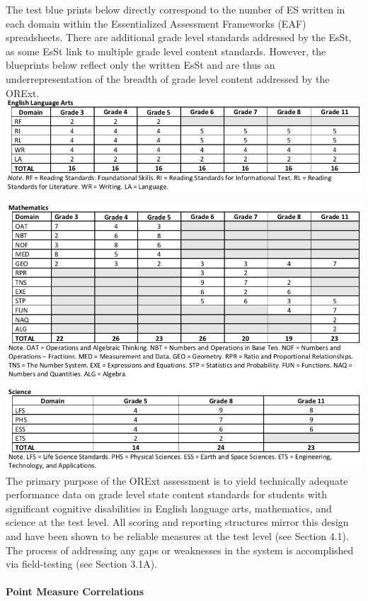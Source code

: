 \documentclass[]{article}
\let\oldparagraph\paragraph
\renewcommand{\paragraph}[1]{\oldparagraph{#1}\mbox{}}
\begin{document}
The test blue prints below directly correspond to the number of ES
written in each domain within the Essentialized Assessment Frameworks
(EAF) spreadsheets. There are additional grade level standards addressed
by the EsSt, as some EsSt link to multiple grade level content
standards. However, the blueprints below reflect only the written EsSt
and are thus an underrepresentation of the breadth of grade level
content addressed by the ORExt. \FloatBarrier
\includegraphics{Figures/EsSt/EsStELA.png} \clearpage

\FloatBarrier
\includegraphics{Figures/EsSt/EsStMathScience.png} The primary purpose
of the ORExt assessment is to yield technically adequate performance
data on grade level state content standards for students with
significant cognitive disabilities in English language arts,
mathematics, and science at the test level. All scoring and reporting
structures mirror this design and have been shown to be reliable
measures at the test level (see Section 4.1). The process of addressing
any gaps or weaknesses in the system is accomplished via field-testing
(see Section 3.1A).

\paragraph{Point Measure Correlations}\label{point-measure-correlations}
\end{document}
